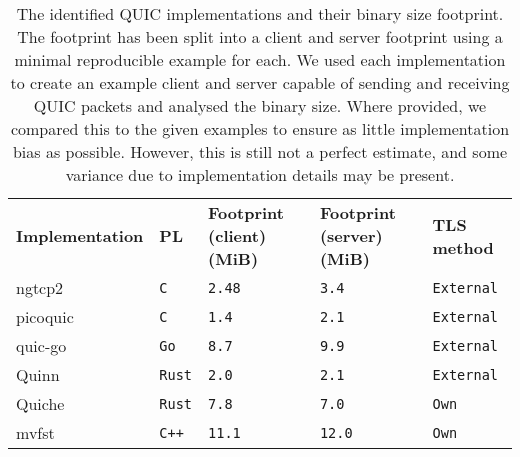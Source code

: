 \begin{table}[ht]
    \caption{The identified QUIC implementations and their binary size footprint. The footprint has been split into a client and server footprint using a minimal reproducible example for each. We used each implementation to create an example client and server capable of sending and receiving QUIC packets and analysed the binary size. Where provided, we compared this to the given examples to ensure as little implementation bias as possible. However, this is still not a perfect estimate, and some variance due to implementation details may be present.}\label{tab:quics}
    \begin{tabular}{@{}lllll@{}}
        \toprule
        \textbf{Implementation} & \textbf{PL}   & \textbf{Footprint (client) (MiB)} & \textbf{Footprint (server) (MiB)} & \textbf{TLS method} \\
        ngtcp2                  & \texttt{C}    & \texttt{2.48}                     & \texttt{3.4}                      & \texttt{External}   \\
        picoquic                & \texttt{C}    & \texttt{1.4}                      & \texttt{2.1}                      & \texttt{External}   \\
        quic-go                 & \texttt{Go}   & \texttt{8.7}                      & \texttt{9.9}                      & \texttt{External}   \\
        Quinn                   & \texttt{Rust} & \texttt{2.0}                      & \texttt{2.1}                      & \texttt{External}   \\
        Quiche                  & \texttt{Rust} & \texttt{7.8}                      & \texttt{7.0}                      & \texttt{Own}        \\
        mvfst                   & \texttt{C++}  & \texttt{11.1}                     & \texttt{12.0}                     & \texttt{Own}        \\
        \bottomrule
    \end{tabular}
\end{table}
